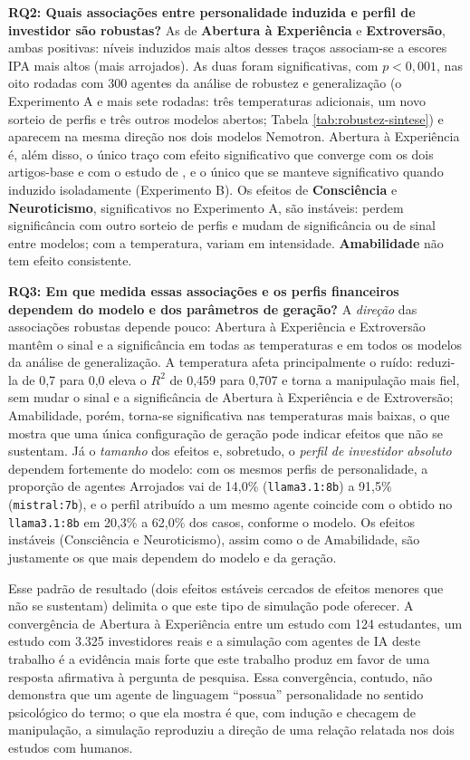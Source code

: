 \textbf{RQ2: Quais associações entre personalidade induzida e perfil de
investidor são robustas?} As de \textbf{Abertura à Experiência} e
\textbf{Extroversão}, ambas positivas: níveis induzidos mais altos desses
traços associam-se a escores IPA mais altos (mais arrojados). As duas
foram significativas, com $p<0{,}001$, nas oito rodadas com 300 agentes
da análise de robustez e generalização (o Experimento A e mais sete
rodadas: três temperaturas adicionais, um novo sorteio de perfis e três
outros modelos abertos; Tabela \ref{tab:robustez-sintese}) e aparecem na
mesma direção nos dois modelos Nemotron. Abertura à Experiência é, além
disso, o único traço com efeito significativo que converge com os dois
artigos-base
\cite{debortoli2019,jiangpengyan2024} e com o estudo de
, e o único que se manteve significativo quando
induzido isoladamente (Experimento B). Os efeitos de
\textbf{Consciência} e \textbf{Neuroticismo}, significativos no
Experimento A, são instáveis: perdem significância com outro
sorteio de perfis e mudam de significância ou de sinal entre modelos;
com a temperatura, variam em intensidade. \textbf{Amabilidade} não tem
efeito consistente.

\textbf{RQ3: Em que medida essas associações e os perfis financeiros
dependem do modelo e dos parâmetros de geração?} A \textit{direção} das
associações robustas depende pouco: Abertura à Experiência e Extroversão
mantêm o sinal e a significância em todas as temperaturas e em todos os
modelos da análise de generalização. A temperatura afeta principalmente o
ruído: reduzi-la de 0,7 para 0,0 eleva o $R^2$ de 0,459 para 0,707 e torna
a manipulação mais fiel, sem mudar o sinal e a significância de Abertura
à Experiência e de Extroversão; Amabilidade, porém, torna-se
significativa nas temperaturas mais baixas, o que mostra que uma única
configuração de geração pode indicar efeitos que não se sustentam. Já o
\textit{tamanho} dos efeitos e, sobretudo, o \textit{perfil de investidor
absoluto} dependem fortemente do modelo: com os mesmos perfis de
personalidade, a proporção de agentes Arrojados vai de 14,0\%
(\texttt{llama3.1:8b}) a 91,5\% (\texttt{mistral:7b}), e o perfil
atribuído a um mesmo agente coincide com o obtido no \texttt{llama3.1:8b}
em 20,3\% a 62,0\% dos casos, conforme o modelo. Os efeitos instáveis
(Consciência e Neuroticismo), assim como o de Amabilidade, são justamente
os que mais dependem do modelo e da geração.

Esse padrão de resultado (dois efeitos estáveis cercados de efeitos
menores que não se sustentam) delimita o que este tipo de simulação pode
oferecer. A convergência de Abertura à Experiência entre um estudo com
124 estudantes, um estudo com 3.325 investidores reais e a simulação com
agentes de IA deste trabalho é a evidência mais forte que este trabalho
produz em favor de uma resposta afirmativa à pergunta de pesquisa. Essa
convergência, contudo, não demonstra que um agente de linguagem
``possua'' personalidade no sentido psicológico do termo; o que ela
mostra é que, com indução e checagem de manipulação, a simulação
reproduziu a direção de uma relação relatada nos dois estudos com
humanos.

